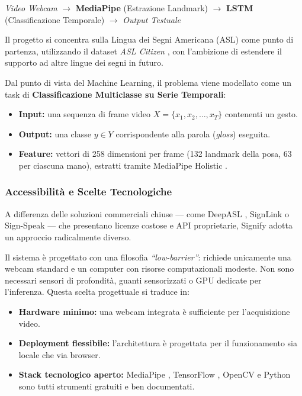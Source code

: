 \begin{center}
    \textit{Video Webcam} $\longrightarrow$ \textbf{MediaPipe} (Estrazione Landmark) $\longrightarrow$ \textbf{LSTM} (Classificazione Temporale) $\longrightarrow$ \textit{Output Testuale}
\end{center}

Il progetto si concentra sulla Lingua dei Segni Americana (ASL) come punto di partenza, utilizzando il dataset \textit{ASL Citizen} \cite{desai2024aslcitizen}, con l'ambizione di estendere il supporto ad altre lingue dei segni in futuro.

Dal punto di vista del Machine Learning, il problema viene modellato come un task di \textbf{Classificazione Multiclasse su Serie Temporali}:
\begin{itemize}
    \item \textbf{Input:} una sequenza di frame video $X = \{x_1, x_2, \dots, x_T\}$ contenenti un gesto.
    \item \textbf{Output:} una classe $y \in Y$ corrispondente alla parola (\textit{gloss}) eseguita.
    \item \textbf{Feature:} vettori di 258 dimensioni per frame (132 landmark della posa, 63 per ciascuna mano), estratti tramite MediaPipe Holistic \cite{mediapipe2020}.
\end{itemize}

\subsubsection{Accessibilità e Scelte Tecnologiche}

A differenza delle soluzioni commerciali chiuse --- come DeepASL \cite{fang2017deepasl}, SignLink o Sign-Speak --- che presentano licenze costose e API proprietarie, Signify adotta un approccio radicalmente diverso.

Il sistema è progettato con una filosofia \textit{``low-barrier''}: richiede unicamente una webcam standard e un computer con risorse computazionali modeste. Non sono necessari sensori di profondità, guanti sensorizzati o GPU dedicate per l'inferenza. Questa scelta progettuale si traduce in:
\begin{itemize}
    \item \textbf{Hardware minimo:} una webcam integrata è sufficiente per l'acquisizione video.
    \item \textbf{Deployment flessibile:} l'architettura è progettata per il funzionamento sia locale che via browser.
    \item \textbf{Stack tecnologico aperto:} MediaPipe \cite{mediapipe2020}, TensorFlow \cite{tensorflow2015}, OpenCV \cite{opencv2000} e Python sono tutti strumenti gratuiti e ben documentati.
\end{itemize}

